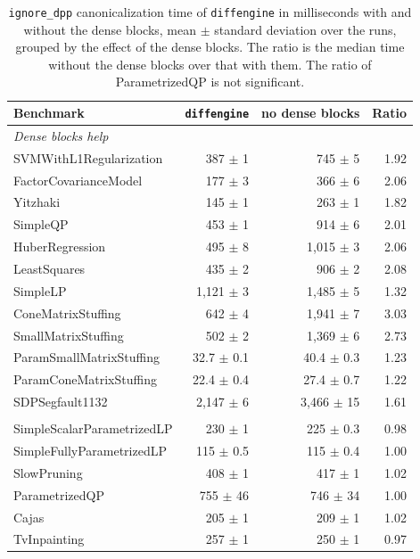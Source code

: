 \begin{table}[htbp]
\centering
\caption[Effect of the dense blocks]{\texttt{ignore\_dpp} canonicalization time of
\texttt{diffengine} in milliseconds with and without the dense blocks, mean $\pm$ standard
deviation over the runs, grouped by the effect of the dense blocks. The ratio is the median
time without the dense blocks over that with them. The ratio of ParametrizedQP is not significant.}
\label{tab:nodense}
{\footnotesize
\begin{tabular}{l rr r}
\toprule
Benchmark & \texttt{diffengine} & no dense blocks & Ratio \\
\midrule
\multicolumn{4}{l}{\textit{Dense blocks help}} \\
SVMWithL1Regularization & 387 $\pm$ 1 & 745 $\pm$ 5 & 1.92 \\
FactorCovarianceModel & 177 $\pm$ 3 & 366 $\pm$ 6 & 2.06 \\
Yitzhaki & 145 $\pm$ 1 & 263 $\pm$ 1 & 1.82 \\
SimpleQP & 453 $\pm$ 1 & 914 $\pm$ 6 & 2.01 \\
HuberRegression & 495 $\pm$ 8 & 1{,}015 $\pm$ 3 & 2.06 \\
LeastSquares & 435 $\pm$ 2 & 906 $\pm$ 2 & 2.08 \\
SimpleLP & 1{,}121 $\pm$ 3 & 1{,}485 $\pm$ 5 & 1.32 \\
ConeMatrixStuffing & 642 $\pm$ 4 & 1{,}941 $\pm$ 7 & 3.03 \\
SmallMatrixStuffing & 502 $\pm$ 2 & 1{,}369 $\pm$ 6 & 2.73 \\
ParamSmallMatrixStuffing & 32.7 $\pm$ 0.1 & 40.4 $\pm$ 0.3 & 1.23 \\
ParamConeMatrixStuffing & 22.4 $\pm$ 0.4 & 27.4 $\pm$ 0.7 & 1.22 \\
SDPSegfault1132 & 2{,}147 $\pm$ 6 & 3{,}466 $\pm$ 15 & 1.61 \\
\addlinespace
\multicolumn{4}{l}{\textit{Little effect}} \\
SimpleScalarParametrizedLP & 230 $\pm$ 1 & 225 $\pm$ 0.3 & 0.98 \\
SimpleFullyParametrizedLP & 115 $\pm$ 0.5 & 115 $\pm$ 0.4 & 1.00 \\
SlowPruning & 408 $\pm$ 1 & 417 $\pm$ 1 & 1.02 \\
ParametrizedQP & 755 $\pm$ 46 & 746 $\pm$ 34 & 1.00 \\
Cajas & 205 $\pm$ 1 & 209 $\pm$ 1 & 1.02 \\
TvInpainting & 257 $\pm$ 1 & 250 $\pm$ 1 & 0.97 \\

\end{tabular}}
\end{table}

